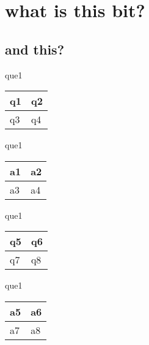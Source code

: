 \documentclass[13.5pt, varwidth=true]{beamer}
\begin{document}
\date{}

\section[topic]{what is this bit?}
\subsection[title]{and this?}

\begin{frame}[shrink=19,fragile]
	\begin{beamercolorbox}[rounded=true, left, shadow=true,wd=14.8cm]{que1}
		\begin{tabular}{p{7cm} | p{7cm}}
			\parbox{7cm}{q1 } & \parbox{7cm}{q2 } \\ 
			\hline
			\parbox{7cm}{q3 } & \parbox{7cm}{q4 } \\
		\end{tabular}
	\end{beamercolorbox}
\end{frame}
\begin{frame}[shrink=19,fragile]
	\begin{beamercolorbox}[rounded=true, left, shadow=true,wd=14.8cm]{que1}
		\begin{tabular}{p{7cm} | p{7cm}}
			\textcolor{ared}{a1 }  & \textcolor{ared}{a2 } \\ 
			\hline
			\textcolor{ared}{a3 }  & \textcolor{ared}{a4 } \\
		\end{tabular}
	\end{beamercolorbox}
\end{frame}

\begin{frame}[shrink=19,fragile]
	\begin{beamercolorbox}[rounded=true, left, shadow=true,wd=14.8cm]{que1}
		\begin{tabular}{p{7cm} | p{7cm}}
			\parbox{7cm}{q5 } & \parbox{7cm}{q6 } \\ 
			\hline
			\parbox{7cm}{q7 } & \parbox{7cm}{q8 } \\
		\end{tabular}
	\end{beamercolorbox}
\end{frame}
\begin{frame}[shrink=19,fragile]
	\begin{beamercolorbox}[rounded=true, left, shadow=true,wd=14.8cm]{que1}
		\begin{tabular}{p{7cm} | p{7cm}}
			\textcolor{ared}{a5 }  & \textcolor{ared}{a6 } \\ 
			\hline
			\textcolor{ared}{a7 }  & \textcolor{ared}{a8 } \\
		\end{tabular}
	\end{beamercolorbox}
\end{frame}
\end{document}
